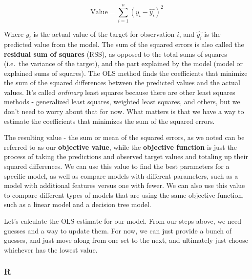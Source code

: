 \documentclass[
  letterpaper,
]{krantz}
\begin{document}
\[
\textrm{Value} = \sum_{i=1}^{n} (y_i - \hat{y_i})^2
\]

Where \(y_i\) is the actual value of the target for observation \(i\),
and \(\hat{y_i}\) is the predicted value from the model. The sum of the
squared errors is also called the \textbf{residual sum of squares}
(RSS), as opposed to the total sums of squares (i.e.~the variance of the
target), and the part explained by the model (model or explained sums of
squares). The OLS method finds the coefficients that minimize the sum of
the squared differences between the predicted values and the actual
values. It's called \emph{ordinary} least squares because there are
other least squares methods - generalized least squares, weighted least
squares, and others, but we don't need to worry about that for now. What
matters is that we have a way to estimate the coefficients that
minimizes the sum of the squared errors.

The resulting value - the sum or mean of the squared errors, as we noted
can be referred to as our \textbf{objective value}, while the
\textbf{objective function} is just the process of taking the
predictions and observed target values and totaling up their squared
differences. We can use this value to find the best parameters for a
specific model, as well as compare models with different parameters,
such as a model with additional features versus one with fewer. We can
also use this value to compare different types of models that are using
the same objective function, such as a linear model and a decision tree
model.

Let's calculate the OLS estimate for our model. From our steps above, we
need guesses and a way to update them. For now, we can just provide a
bunch of guesses, and just move along from one set to the next, and
ultimately just choose whichever has the lowest value.

\subsubsection{R}
\end{document}
